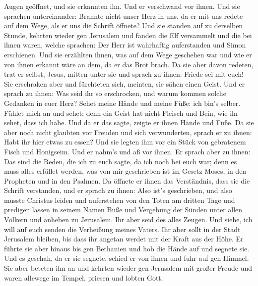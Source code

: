Augen geöffnet, und sie erkannten ihn. Und er verschwand vor ihnen.
 Und sie sprachen untereinander: Brannte nicht unser Herz
in uns, da er mit uns redete auf dem Wege, als er uns die Schrift
öffnete?  Und sie standen auf zu derselben Stunde, kehrten
wieder gen Jerusalem und fanden die Elf versammelt und die bei ihnen
waren,  welche sprachen: Der Herr ist wahrhaftig
auferstanden und Simon erschienen.  Und sie erzählten
ihnen, was auf dem Wege geschehen war und wie er von ihnen erkannt wäre
an dem, da er das Brot brach.  Da sie aber davon redeten,
trat er selbst, Jesus, mitten unter sie und sprach zu ihnen: Friede sei
mit euch!  Sie erschraken aber und fürchteten sich,
meinten, sie sähen einen Geist.  Und er sprach zu ihnen:
Was seid ihr so erschrocken, und warum kommen solche Gedanken in euer
Herz?  Sehet meine Hände und meine Füße: ich bin's selber.
Fühlet mich an und sehet; denn ein Geist hat nicht Fleisch und Bein, wie
ihr sehet, dass ich habe.  Und da er das sagte, zeigte er
ihnen Hände und Füße.  Da sie aber noch nicht glaubten vor
Freuden und sich verwunderten, sprach er zu ihnen: Habt ihr hier etwas
zu essen?  Und sie legten ihm vor ein Stück von gebratenem
Fisch und Honigseim.  Und er nahm's und aß vor ihnen.
 Er sprach aber zu ihnen: Das sind die Reden, die ich zu
euch sagte, da ich noch bei euch war; denn es muss alles erfüllet
werden, was von mir geschrieben ist im Gesetz Moses, in den Propheten
und in den Psalmen.  Da öffnete er ihnen das Verständnis,
dass sie die Schrift verstanden,  und er sprach zu ihnen:
Also ist's geschrieben, und also musste Christus leiden und auferstehen
von den Toten am dritten Tage  und predigen lassen in
seinem Namen Buße und Vergebung der Sünden unter allen Völkern und
anheben zu Jerusalem.  Ihr aber seid des alles Zeugen.
 Und siehe, ich will auf euch senden die Verheißung meines
Vaters. Ihr aber sollt in der Stadt Jerusalem bleiben, bis dass ihr
angetan werdet mit der Kraft aus der Höhe.  Er führte sie
aber hinaus bis gen Bethanien und hob die Hände auf und segnete sie.
 Und es geschah, da er sie segnete, schied er von ihnen und
fuhr auf gen Himmel.  Sie aber beteten ihn an und kehrten
wieder gen Jerusalem mit großer Freude  und waren allewege
im Tempel, priesen und lobten Gott.
